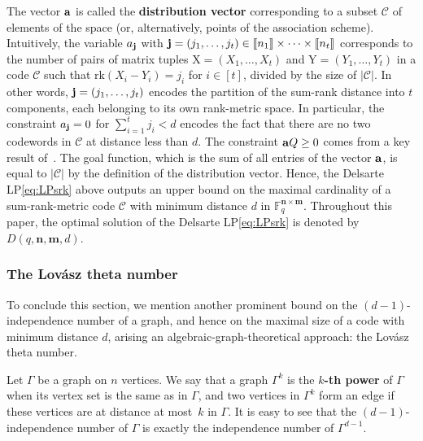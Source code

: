 \documentclass[a4paper]{article}
\newcommand{\F}{\mathbb{F}}
\newcommand{\bfn}{\mathbf {n}}
\newcommand{\bfm}{\mathbf {m}}
\newcommand{\spac}{\F^{\bfn\times\bfm}_q}
\newcommand{\rk}{\mathrm{rk}}
\newcommand{\db}[1]{\llbracket #1 \rrbracket}
\begin{document}
The vector $\bf a$ is called the \textbf{distribution vector} corresponding to a subset $\mathcal{C}$ of elements of the space (or, alternatively, points of the association scheme). Intuitively, the variable $a_{\bf j}$ with ${\bf j}=(j_1,\dots,j_t)\in\db{n_1}\times\cdots\times\db{n_t}$ corresponds to the number of pairs of matrix tuples $\mathrm{X}=(X_1,\dots,X_t)$ and $\mathrm{Y}=(Y_1,\dots,Y_t)$ in a code $\mathcal{C}$ such that $\rk(X_i-Y_i)=j_i$ for $i\in[t]$, divided by the size of $|\mathcal{C}|$. In other words, ${\bf j}=(j_1,\dots,j_t)$ encodes the partition of the sum-rank distance into $t$ components, each belonging to its own rank-metric space. In particular, the constraint $a_{\bf j}=0$ for $\sum_{i=1}^t j_i<d$ encodes the fact that there are no two codewords in $\mathcal{C}$ at distance less than $d$. The constraint ${\bf a}Q\geq 0$ comes from a key result of~\cite{DelsarteLP}. The goal function, which is the sum of all entries of the vector $\bf a$, is equal to $|\mathcal{C}|$ by the definition of the distribution vector. Hence, the Delsarte LP\:\eqref{eq:LPsrk} above outputs an upper bound on the maximal cardinality of a sum-rank-metric code $\mathcal{C}$ with minimum distance $d$ in $\spac$. Throughout this paper, the optimal solution of the Delsarte LP\:\eqref{eq:LPsrk} is denoted by~$D(q,\bfn,\bfm,d)$.


\subsubsection{The Lov\'asz theta number}\label{sssec:Lovasz}\label{sec;Lovasztheta}

To conclude this section, we mention another prominent bound on the $(d-1)$-independence number of a graph, and hence on the maximal size of a code with minimum distance $d$, arising an algebraic-graph-theoretical approach: the Lov\'asz theta number.

Let $\Gamma$ be a graph on $n$ vertices. We say that a graph $\Gamma^k$ is the \textbf{$k$-th power} of $\Gamma$ when its vertex set is the same as in $\Gamma$, and two vertices in $\Gamma^k$ form an edge if these vertices are at distance at most~$k$ in $\Gamma$. It is easy to see that the $(d-1)$-independence number of $\Gamma$ is exactly the independence number of $\Gamma^{d-1}$.
\end{document}
